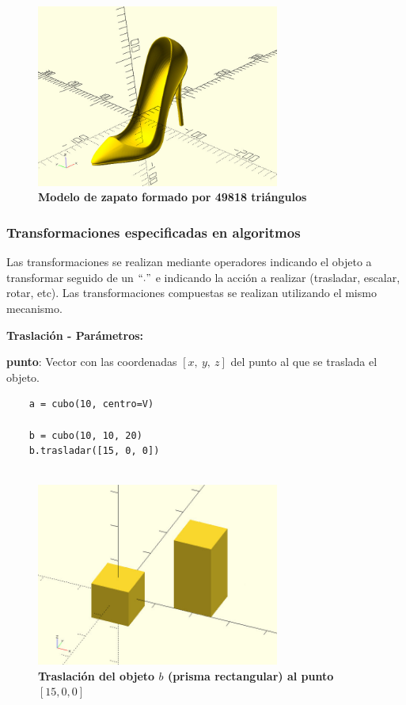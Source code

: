 \begin{figure}[h]
\includegraphics[width=8cm]{Img/Modelos/modelado14.jpg}
\centering
\caption{\textbf{ \footnotesize{Modelo de zapato formado por 49818 triángulos }}}
\end{figure}

\clearpage
\subsubsection{Transformaciones especificadas en algoritmos}

Las transformaciones se realizan mediante operadores indicando el objeto a transformar seguido de un $``."$ e indicando la acción a realizar (trasladar, escalar, rotar, etc). Las transformaciones compuestas se realizan utilizando el mismo mecanismo.

\begin{description}
\item  \textbf{Traslación - Parámetros:}
\item  \textbf{punto}: Vector con las coordenadas $[x,\ y, \ z]$ del punto al que se traslada el objeto.
\end{description}

\begin{verbatim}
    a = cubo(10, centro=V)
    
    b = cubo(10, 10, 20)
    b.trasladar([15, 0, 0]) 
   
\end{verbatim}

\begin{figure}[h]
\includegraphics[width=8cm]{Img/Modelos/modelado11.jpg}
\centering
\caption{\textbf{ \footnotesize{Traslación del objeto $b$ (prisma rectangular) al punto $[15, 0, 0]$}}}
\label{fig:traslacion}
\end{figure}

